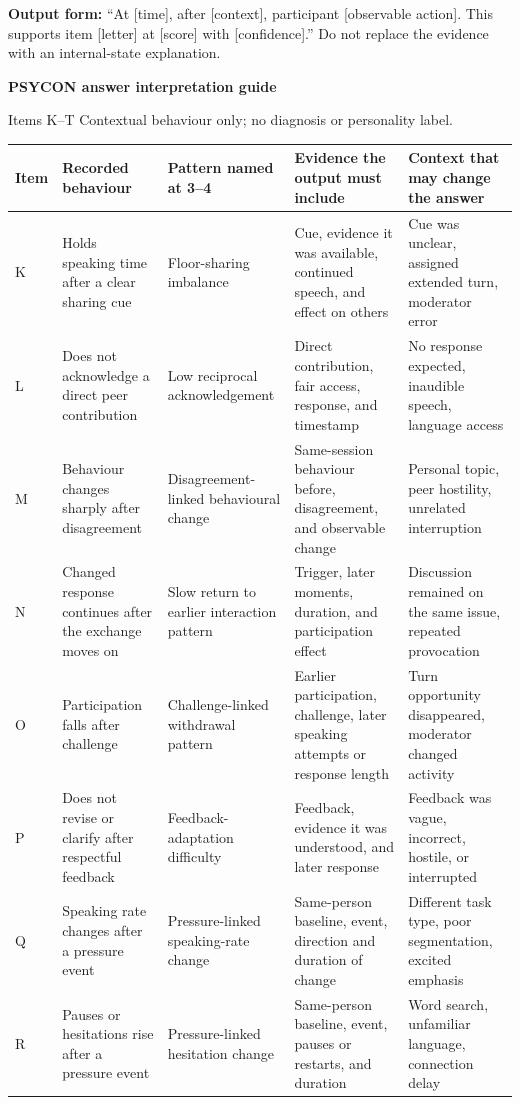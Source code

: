\documentclass[10pt,a4paper]{article}
\newcommand{\GuideTitle}[1]{
{\LARGE\bfseries\color{PSYCONBlue}PSYCON answer interpretation guide}\par
{\small #1 \quad Contextual behaviour only; no diagnosis or personality label.}\par
\vspace{1.5mm}{\color{PSYCONBlue}\rule{\linewidth}{0.7pt}}\vspace{1.5mm}}
\begin{document}
\vspace{1.5mm}
{\scriptsize\textbf{Output form:} ``At [time], after [context], participant [observable action]. This supports item [letter] at [score] with [confidence].'' Do not replace the evidence with an internal-state explanation.}\par

\clearpage
\vspace*{10mm}
\GuideTitle{Items K--T}
\begingroup\scriptsize
\begin{tabularx}{\linewidth}{@{}L{8mm}L{47mm}L{39mm}L{65mm}Y@{}}
\toprule
\textbf{Item} & \textbf{Recorded behaviour} & \textbf{Pattern named at 3--4} & \textbf{Evidence the output must include} & \textbf{Context that may change the answer}\\\midrule
K & Holds speaking time after a clear sharing cue & Floor-sharing imbalance & Cue, evidence it was available, continued speech, and effect on others & Cue was unclear, assigned extended turn, moderator error\\
L & Does not acknowledge a direct peer contribution & Low reciprocal acknowledgement & Direct contribution, fair access, response, and timestamp & No response expected, inaudible speech, language access\\
M & Behaviour changes sharply after disagreement & Disagreement-linked behavioural change & Same-session behaviour before, disagreement, and observable change & Personal topic, peer hostility, unrelated interruption\\
N & Changed response continues after the exchange moves on & Slow return to earlier interaction pattern & Trigger, later moments, duration, and participation effect & Discussion remained on the same issue, repeated provocation\\
O & Participation falls after challenge & Challenge-linked withdrawal pattern & Earlier participation, challenge, later speaking attempts or response length & Turn opportunity disappeared, moderator changed activity\\
P & Does not revise or clarify after respectful feedback & Feedback-adaptation difficulty & Feedback, evidence it was understood, and later response & Feedback was vague, incorrect, hostile, or interrupted\\
Q & Speaking rate changes after a pressure event & Pressure-linked speaking-rate change & Same-person baseline, event, direction and duration of change & Different task type, poor segmentation, excited emphasis\\
R & Pauses or hesitations rise after a pressure event & Pressure-linked hesitation change & Same-person baseline, event, pauses or restarts, and duration & Word search, unfamiliar language, connection delay\\

\end{tabularx}
\end{document}

